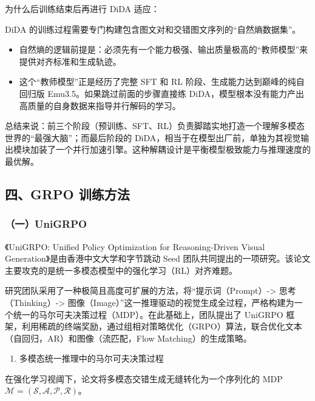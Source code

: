 为什么后训练结束后再进行 DiDA 适应：

DiDA 的训练过程需要专门构建包含图文对和交错图文序列的``自然熵数据集''。

\begin{itemize}
\tightlist
\item
  自然熵的逻辑前提是：必须先有一个能力极强、输出质量极高的``教师模型''来提供对齐标准和生成轨迹。
\item
  这个``教师模型''正是经历了完整 SFT 和 RL 阶段、生成能力达到巅峰的纯自回归版 Emu3.5。如果跳过前面的步骤直接练 DiDA，模型根本没有能力产出高质量的自身数据来指导并行解码的学习。
\end{itemize}

总结来说：前三个阶段（预训练、SFT、RL）负责脚踏实地打造一个理解多模态世界的``最强大脑''；而最后阶段的 DiDA，相当于在模型出厂前，单独为其视觉输出模块加装了一个并行加速引擎。这种解耦设计是平衡模型极致能力与推理速度的最优解。

\hypertarget{ux56dbgrpo-ux8badux7ec3ux65b9ux6cd5}{%
\subsection{四、GRPO 训练方法}\label{ux56dbgrpo-ux8badux7ec3ux65b9ux6cd5}}

\hypertarget{ux4e00unigrpo}{%
\subsubsection{（一）UniGRPO}\label{ux4e00unigrpo}}

《UniGRPO: Unified Policy Optimization for Reasoning-Driven Visual Generation》是由香港中文大学和字节跳动 Seed 团队共同提出的一项研究。该论文主要攻克的是统一多模态模型中的强化学习（RL）对齐难题。

研究团队采用了一种极简且高度可扩展的方法，将``提示词（Prompt）-\textgreater{} 思考（Thinking）-\textgreater{} 图像（Image）''这一推理驱动的视觉生成全过程，严格构建为一个统一的马尔可夫决策过程（MDP）。在此基础上，团队提出了 UniGRPO 框架，利用稀疏的终端奖励，通过组相对策略优化（GRPO）算法，联合优化文本（自回归，AR）和图像（流匹配，Flow Matching）的生成策略。

\begin{enumerate}
\def\labelenumi{\arabic{enumi}.}
\tightlist
\item
  多模态统一推理中的马尔可夫决策过程
\end{enumerate}

在强化学习视阈下，论文将多模态交错生成无缝转化为一个序列化的 MDP \(\mathcal{M}=(\mathcal{S},\mathcal{A},\mathcal{P},\mathcal{R})\)。


